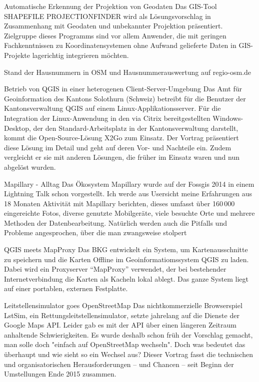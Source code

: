 %
{Automatische Erkennung der Projektion von Geodaten}%
{}%
{Das GIS-Tool SHAPEFILE PROJECTIONFINDER wird als Lösungsvorschlag
in Zusammenhang mit Geodaten und
unbekannter Projektion präsentiert. Zielgruppe dieses Programms sind vor
allem Anwender, die mit geringen
Fachkenntnissen zu Koordinatensystemen ohne Aufwand gelieferte Daten in
GIS-Projekte lagerichtig integrieren möchten.}

%
{Stand der Hausnummern in OSM und Hausnummerauswertung auf regio-osm.de}%
{}%
{}


%
{Betrieb von QGIS in einer heterogenen Client-Server-Umgebung}%
{}%
{Das Amt für Geoinformation des Kantons Solothurn (Schweiz) betreibt für die Benutzer der Kantonsverwaltung QGIS auf einem Linux-Applikationsserver. Für die Integration der Linux-Anwendung in den via Citrix bereitgestellten Windows-Desktop, der den Standard-Arbeitsplatz in der Kantonsverwaltung darstellt, kommt die Open-Source-Lösung X2Go zum Einsatz.
Der Vortrag präsentiert diese Lösung im Detail und geht auf deren Vor- und Nachteile ein. Zudem vergleicht er sie mit anderen Lösungen, die früher im Einsatz waren und nun abgelöst wurden.}

%
{Mapillary - Alltag}%
{}%
{Das Ökosystem Mapillary wurde auf der Fossgis 2014 in einem Lightning
Talk schon vorgestellt.
Ich werde aus Usersicht meine Erfahrungen aus 18 Monaten Aktivität mit
Mapillary berichten, dieses umfasst über 160\,000 eingereichte Fotos,
diverse genutzte Mobilgeräte, viele besuchte Orte und mehrere Methoden
der Datenbearbeitung. Natürlich werden auch die Pitfalls und Probleme angesprochen, über die
man zwangsweise stolpert}


%
{QGIS meets MapProxy}%
{}%
{Das BKG entwickelt ein System, um Kartenausschnitte zu speichern und
die Karten Offline im Geoinformatiomssystem QGIS zu laden. Dabei wird ein
Proxyserver "`MapProxy"' verwendet, der bei bestehender Internetverbindung
die Karten als Kacheln lokal ablegt. Das ganze System liegt auf einer
portablen, externen Festplatte.}

%
{Leitstellensimulator goes OpenStreetMap}%
{}%
{Das nichtkommerzielle Browserspiel LstSim, ein Rettungsleitstellensimulator, setzte jahrelang auf die Dienste
der Google Maps API. Leider gab es mit der API über einen längeren Zeitraum anhaltende Schwierigkeiten. Es wurde
deshalb schon früh der Vorschlag gemacht, man solle doch "einfach auf OpenStreetMap wechseln". Doch was bedeutet
das überhaupt und wie sieht so ein Wechsel aus? Dieser Vortrag fasst die technischen und organisatorischen
Herausforderungen – und Chancen – seit Beginn der Umstellungen Ende 2015 zusammen.}

